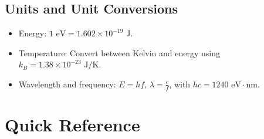 \documentclass{article}
\newcommand{\tipbox}[1]{\begin{tcolorbox}[colback=green!10] #1 \end{tcolorbox}}
\begin{document}
\subsection{Units and Unit Conversions}
\tipbox{
\begin{itemize}
    \item Energy: $1 \text{ eV} = 1.602 \times 10^{-19} \text{ J}$.
    \item Temperature: Convert between Kelvin and energy using $k_B = 1.38 \times 10^{-23} \text{ J/K}$.
    \item Wavelength and frequency: $E = hf$, $\lambda = \frac{c}{f}$, with $hc = 1240 \text{ eV} \cdot \text{nm}$.
\end{itemize}
}

\section{Quick Reference}
\end{document}
